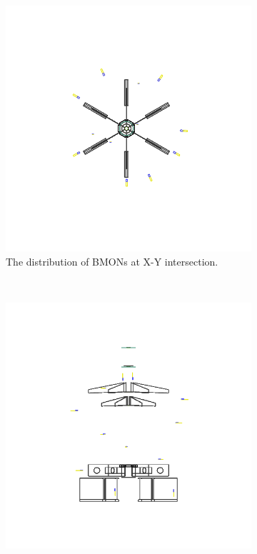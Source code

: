 \documentclass{JINST}
\begin{document}
\begin{figure}
        \centering
        \begin{subfigure}[b]{0.5\textwidth}
                \centering
                \includegraphics[width=\textwidth]{bmon_positions_XY_in.png}
                \caption{ The distribution of BMONs at X-Y intersection.}
                \label{fig14a}
        \end{subfigure}%
        ~ %
        \begin{subfigure}[b]{0.5\textwidth}
                \centering
                \includegraphics[width=\textwidth]{bmon_positions_YZ_in.png}

\end{subfigure}
\end{figure}
\end{document}
